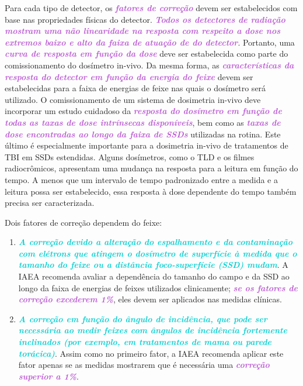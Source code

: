 \documentclass[11pt,a4paper]{article}
\newcounter{exemplo}
\begin{document}
	Para cada tipo de detector, os \textcolor{MediumOrchid}{\textbf{\textit{fatores de correção}}} devem ser estabelecidos com base nas propriedades físicas do detector. \textcolor{MediumOrchid}{\textbf{\textit{Todos os detectores de radiação mostram uma não linearidade na resposta com respeito a dose nos extremos baixo e alto da faixa de atuação de do detector}}}. Portanto, uma \textcolor{MediumOrchid}{\textbf{\textit{curva de resposta em função da dose}}} deve ser estabelecida como parte do comissionamento do dosímetro in-vivo. Da mesma forma, as \textcolor{MediumOrchid}{\textbf{\textit{características da resposta do detector em função da energia do feixe}}} devem ser estabelecidas para a faixa de energias de feixe nas quais o dosímetro será utilizado. O comissionamento de um sistema de dosimetria in-vivo deve incorporar um estudo cuidadoso da \textcolor{MediumOrchid}{\textbf{\textit{resposta do dosímetro em função de todas as taxas de dose intrínsecas disponíveis}}}, bem como as \textcolor{MediumOrchid}{\textbf{\textit{taxas de dose encontradas ao longo da faixa de SSDs}}} utilizadas na rotina. Este último é especialmente importante para a dosimetria in-vivo de tratamentos de TBI em SSDs estendidas. Alguns dosímetros, como o TLD e os filmes radiocrômicos, apresentam uma mudança na resposta para a leitura em função do tempo. A menos que um intervalo de tempo padronizado entre a medida e a leitura possa ser estabelecido, essa resposta à dose dependente do tempo também precisa ser caracterizada.

	Dois fatores de correção dependem do feixe:

	\begin{enumerate}
		\item \textcolor{DarkTurquoise}{\textbf{\textit{ A correção devido a alteração do espalhamento e da contaminação com elétrons que atingem o dosímetro de superfície à medida que o tamanho do feixe ou a distância foco-superfície (SSD) mudam}}}. A IAEA recomenda avaliar a dependência do tamanho do campo e da SSD ao longo da faixa de energias de feixes utilizados clinicamente; \textcolor{MediumOrchid}{\textbf{\textit{se os fatores de correção excederem 1\%}}}, eles devem ser aplicados nas medidas clínicas.
		
		\item \textcolor{DarkTurquoise}{\textbf{\textit{A correção em função do ângulo de incidência, que pode ser necessária ao medir feixes com ângulos de incidência fortemente inclinados (por exemplo, em tratamentos de mama ou parede torácica)}}}. Assim como no primeiro fator, a IAEA recomenda aplicar este fator apenas se as medidas mostrarem que é necessária uma \textcolor{MediumOrchid}{\textbf{\textit{correção superior a 1\%}}}.
	\end{enumerate}
	
\end{document}
